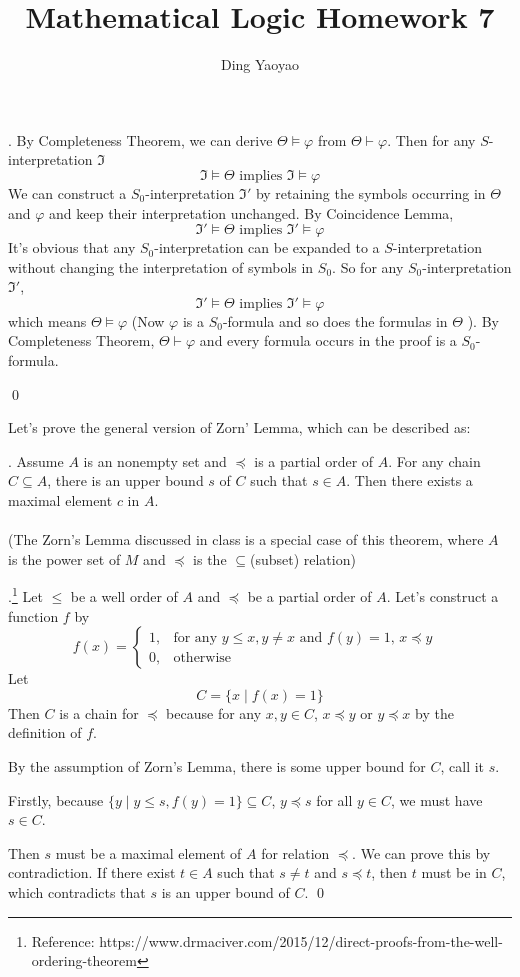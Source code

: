 \documentclass[10pt,a4paper]{article}
\author{Ding Yaoyao}
\title{Mathematical Logic Homework 7}
\newenvironment{sol}[1]
{\par\vspace{3mm}\noindent{\it Solution #1}.}
{\qed}
\newenvironment{thm}[1]
{\par\vspace{3mm}\noindent{\textbf{#1}}.\quad}{\\\\}
\newcommand{\fI}{\mathfrak{I}}
\begin{document}
	\maketitle
	
	\begin{sol}{7.1}
		By Completeness Theorem, we can derive $\Theta \models \varphi$ from $\Theta \vdash \varphi$. Then for any $S$-interpretation $\mathfrak{I}$ 
		$$
			\fI \models \Theta \text{ implies } \fI \models \varphi
		$$
		We can construct a $S_0$-interpretation $\fI'$ by retaining the symbols occurring in $\Theta$ and $\varphi$ and keep their interpretation unchanged. By Coincidence Lemma, 
		$$
			\fI' \models \Theta \text{ implies } \fI' \models \varphi 
		$$
		It's obvious that any $S_0$-interpretation can be expanded to a $S$-interpretation without changing the interpretation of symbols in $S_0$. So for any $S_0$-interpretation $\fI'$,
		$$
					\fI' \models \Theta \text{ implies } \fI' \models \varphi 
		$$
		which means $\Theta \models \varphi$ (Now $\varphi$ is a $S_0$-formula and so does the formulas in $\Theta$ ). By Completeness Theorem, $\Theta \vdash \varphi$ and every formula occurs in the proof is a $S_0$-formula. 
		
	\end{sol}

	Let's prove the general version of Zorn' Lemma, which can be described as:
	\begin{thm}{Zorn's Lemma}
		Assume $A$ is an nonempty set and $\preceq$ is a partial order of $A$. For any chain $C \subseteq A$, there is an upper bound $s$ of $C$ such that $s \in A$. Then there exists a maximal element $c$ in $A$.
	\end{thm}
	(The Zorn's Lemma discussed in class is a special case of this theorem, where $A$ is the power set of $M$ and $\preceq$ is the $\subseteq$(subset) relation)

	\begin{sol}{7.2}\footnote{Reference: 	https://www.drmaciver.com/2015/12/direct-proofs-from-the-well-ordering-theorem}
		Let $\leq$ be a well order of $A$ and $\preceq$ be a partial order of $A$. Let's construct a function $f$
		by
		$$
		f(x) = 
		\begin{cases}
			1, & \text{for any $y\leq x, y\neq x$ and $f(y) = 1$, $x \preceq y$ }\\
			0, & \text{otherwise}
		\end{cases}
		$$
		Let 
		$$C = \{x \mid f(x) = 1\}$$
		Then $C$ is a chain for $\preceq$ because for any $x, y \in C$, $x \preceq y$ or $y \preceq x$ by the definition of $f$.
		
		By the assumption of Zorn's Lemma, there is some upper bound for $C$, call it $s$.
		
		Firstly, because $\{y \mid y\leq s,f(y)=1\} \subseteq C$, $y \preceq s$ for all $y \in C$, we must have $s \in C$.
	
		Then $s$ must be a maximal element of $A$ for relation $\preceq$. We can prove this by contradiction. If there exist $t \in A$ such that $s \neq t$ and $s \preceq t$, then $t$ must be in $C$, which contradicts that $s$ is an upper bound of $C$.
	\end{sol}
\end{document}
